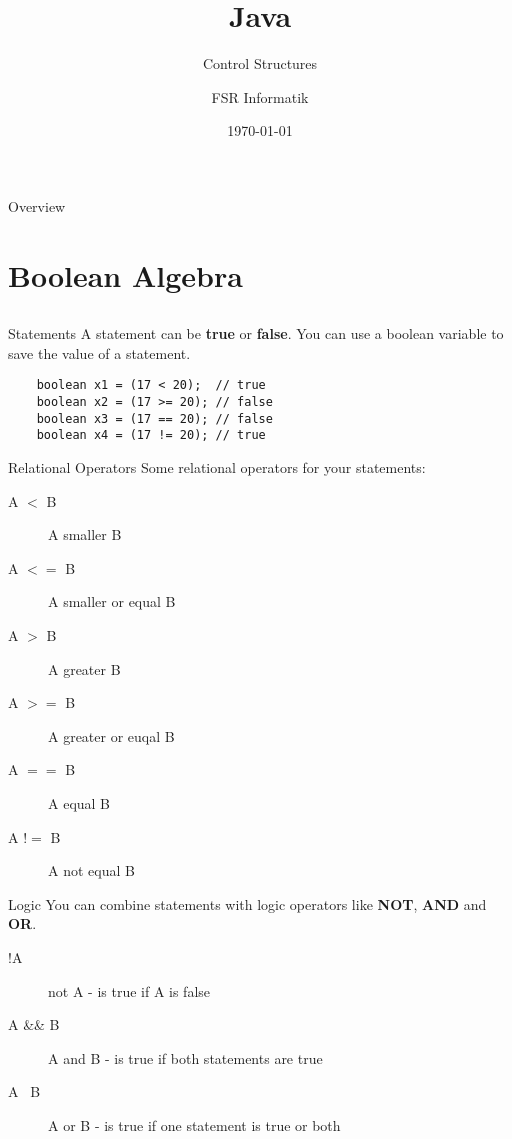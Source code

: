 

\title{Java}
\subtitle{Control Structures}
\author{FSR Informatik}
\date{\today}



\begin{frame}
\titlepage
\end{frame}
\begin{frame}{Overview}
\tableofcontents
\end{frame}

\section{Boolean Algebra}
\subsection{}
\begin{frame}[fragile]{Statements}
	A statement can be \textbf{true} or \textbf{false}. 
	You can use a boolean variable to save the value of a statement.
	\begin{lstlisting}
	boolean x1 = (17 < 20);  // true
	boolean x2 = (17 >= 20); // false
	boolean x3 = (17 == 20); // false
	boolean x4 = (17 != 20); // true
	\end{lstlisting}
\end{frame}

\begin{frame}{Relational Operators}
	Some relational operators for your statements:
	\begin{description}
		\item[A $<$ B] A smaller B
		\item[A $<=$ B] A smaller or equal B
		\item[A $>$ B] A greater B
		\item[A $>=$ B] A greater or euqal B
		\item[A $==$ B] A equal B
		\item[A $!=$ B] A not equal B
	\end{description}
\end{frame}

\begin{frame}{Logic}
	You can combine statements with logic operators like \textbf{NOT}, \textbf{AND} and \textbf{OR}.
	\begin{description}
		\item[!A] not A - is true if A is false
		\item[A \&\& B] A and B - is true if both statements are true
		\item[A \textbar\textbar\ B] A or B - is true if one statement is true or both
	\end{description}
\end{frame}

